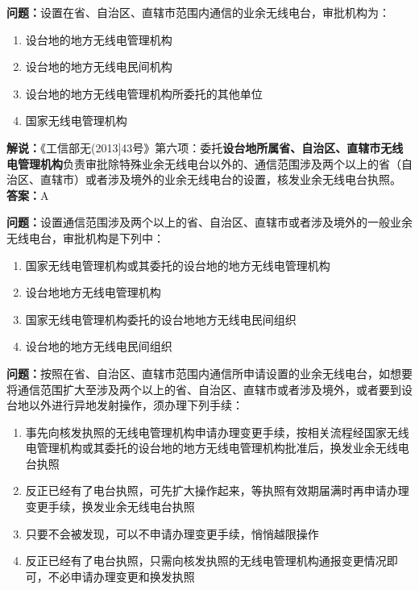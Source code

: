 \textbf{问题：}设置在省、自治区、直辖市范围内通信的业余无线电台，审批机构为：
\begin{enumerate}[label=\Alph*), leftmargin=1.5cm]
	\item 设台地的地方无线电管理机构
	\item 设台地的地方无线电民间机构
	\item 设台地的地方无线电管理机构所委托的其他单位
	\item 国家无线电管理机构
\end{enumerate}
\textbf{解说：}《工信部无(2013]43号》第六项：委托\textbf{设台地所属省、自治区、直辖市无线电管理机构}负责审批除特殊业余无线电台以外的、通信范围涉及两个以上的省（自治区、直辖市）或者涉及境外的业余无线电台的设置，核发业余无线电台执照。\\\textbf{答案：}A

\textbf{问题：}设置通信范围涉及两个以上的省、自治区、直辖市或者涉及境外的一般业余无线电台，审批机构是下列中：
\begin{enumerate}[label=\Alph*), leftmargin=1.5cm]
	\item 国家无线电管理机构或其委托的设台地的地方无线电管理机构
	\item 设台地地方无线电管理机构
	\item 国家无线电管理机构委托的设台地地方无线电民间组织
	\item 设台地的地方无线电民间组织
\end{enumerate}

\textbf{问题：}按照在省、自治区、直辖市范围内通信所申请设置的业余无线电台，如想要将通信范围扩大至涉及两个以上的省、自治区、直辖市或者涉及境外，或者要到设台地以外进行异地发射操作，须办理下列手续：
\begin{enumerate}[label=\Alph*), leftmargin=1.5cm]
	\item 事先向核发执照的无线电管理机构申请办理变更手续，按相关流程经国家无线电管理机构或其委托的设台地的地方无线电管理机构批准后，换发业余无线电台执照
	\item 反正已经有了电台执照，可先扩大操作起来，等执照有效期届满时再申请办理变更手续，换发业余无线电台执照
	\item 只要不会被发现，可以不申请办理变更手续，悄悄越限操作
	\item 反正已经有了电台执照，只需向核发执照的无线电管理机构通报变更情况即可，不必申请办理变更和换发执照
\end{enumerate}

